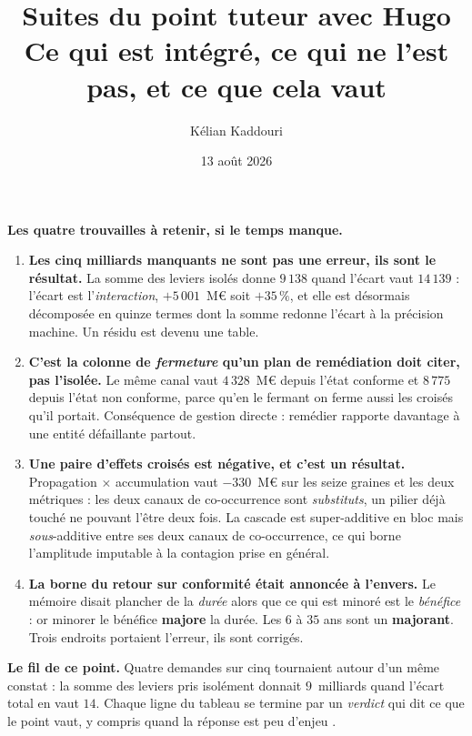 \documentclass[11pt,a4paper]{article}
\title{\vspace{-1.3cm}\color{navy}\bfseries Suites du point tuteur avec Hugo\\[2pt]
  \large Ce qui est intégré, ce qui ne l'est pas, et ce que cela vaut}
\author{Kélian Kaddouri}
\date{13 août 2026}
\begin{document}
\maketitle
\thispagestyle{fancy}
\vspace{-0.7cm}

\begin{phare}
\textbf{Les quatre trouvailles à retenir, si le temps manque.}
\begin{enumerate}[leftmargin=*,itemsep=2pt,topsep=3pt]
\item \textbf{Les cinq milliards manquants ne sont pas une erreur, ils sont le résultat.} La somme
des leviers isolés donne $9\,138$ quand l'écart vaut $14\,139$ : l'écart est l'\emph{interaction},
$+5\,001$~M\euro{} soit $+35\,\%$, et elle est désormais décomposée en quinze termes dont la somme
redonne l'écart à la précision machine. Un résidu est devenu une table.
\item \textbf{C'est la colonne de \emph{fermeture} qu'un plan de remédiation doit citer, pas
l'isolée.} Le même canal vaut $4\,328$~M\euro{} depuis l'état conforme et $8\,775$ depuis l'état
non conforme, parce qu'en le fermant on ferme aussi les croisés qu'il portait. Conséquence de
gestion directe : remédier rapporte davantage à une entité défaillante partout.
\item \textbf{Une paire d'effets croisés est négative, et c'est un résultat.} Propagation
$\times$ accumulation vaut $-330$~M\euro{} sur les seize graines et les deux métriques : les deux
canaux de co-occurrence sont \emph{substituts}, un pilier déjà touché ne pouvant l'être deux fois.
La cascade est super-additive en bloc mais \emph{sous}-additive entre ses deux canaux de
co-occurrence, ce qui borne l'amplitude imputable à la contagion prise en général.
\item \textbf{La borne du retour sur conformité était annoncée à l'envers.} Le mémoire disait
\og plancher \fg{} de la \emph{durée} alors que ce qui est minoré est le \emph{bénéfice} : or
minorer le bénéfice \textbf{majore} la durée. Les $6$ à $35$ ans sont un \textbf{majorant}. Trois
endroits portaient l'erreur, ils sont corrigés.
\end{enumerate}
\end{phare}

\vspace{0.2cm}
\begin{cle}
\textbf{Le fil de ce point.} Quatre demandes sur cinq tournaient autour d'un même constat : la
somme des leviers pris isolément donnait $9$~milliards quand l'écart total en vaut $14$. Chaque
ligne du tableau se termine par un \emph{verdict} qui dit ce que le point vaut, y compris quand la
réponse est \og peu d'enjeu \fg.
\end{cle}
\end{document}
